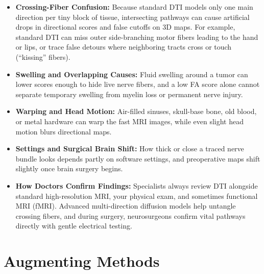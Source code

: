 \begin{itemize}
    \item \textbf{Crossing-Fiber Confusion:} Because standard DTI models only one main direction per tiny block of tissue, intersecting pathways can cause artificial drops in directional scores and false cutoffs on 3D maps. For example, standard DTI can miss outer side-branching motor fibers leading to the hand or lips, or trace false detours where neighboring tracts cross or touch (``kissing'' fibers).
    \item \textbf{Swelling and Overlapping Causes:} Fluid swelling around a tumor can lower scores enough to hide live nerve fibers, and a low FA score alone cannot separate temporary swelling from myelin loss or permanent nerve injury.
    \item \textbf{Warping and Head Motion:} Air-filled sinuses, skull-base bone, old blood, or metal hardware can warp the fast MRI images, while even slight head motion blurs directional maps.
    \item \textbf{Settings and Surgical Brain Shift:} How thick or close a traced nerve bundle looks depends partly on software settings, and preoperative maps shift slightly once brain surgery begins.
    \item \textbf{How Doctors Confirm Findings:} Specialists always review DTI alongside standard high-resolution MRI, your physical exam, and sometimes functional MRI (fMRI). Advanced multi-direction diffusion models help untangle crossing fibers, and during surgery, neurosurgeons confirm vital pathways directly with gentle electrical testing.
\end{itemize}

\section{Augmenting Methods}

